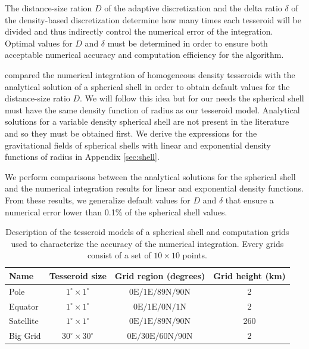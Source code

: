 \documentclass[extra]{gji}
\begin{document}
The distance-size ration $D$ of the adaptive discretization and the delta ratio $\delta$
of the density-based discretization determine how many times each tesseroid will be
divided and thus indirectly control the numerical error of the integration.
Optimal values for $D$ and $\delta$ must be determined in order to ensure both
acceptable numerical accuracy and computation efficiency for the algorithm.

\citet{Uieda2016} compared the numerical integration of homogeneous density tesseroids
with the analytical solution of a spherical shell \citep{Mikuska2006,Grombein2013} in
order to obtain default values for the distance-size ratio $D$.
We will follow this idea but for our needs the spherical shell must
have the same density function of radius as our tesseroid model.
Analytical solutions for a variable density spherical shell are not present in the
literature and so they must be obtained first.
We derive the expressions for the gravitational fields of spherical shells with linear
and exponential density functions of radius in Appendix \ref{sec:shell}.

We perform comparisons between the analytical solutions for the spherical shell and the
numerical integration results for linear and exponential density functions.
From these results, we generalize default values for $D$ and $\delta$ that ensure a
numerical error lower than 0.1\% of the spherical shell values.

\begin{table}
\caption{
    Description of the tesseroid models of a spherical shell and computation grids
    used to characterize the accuracy of the numerical integration.
    Every grids consist of a set of $10 \times 10$ points.
}
\label{tab:grids}
\begin{tabular}{lccc}
    Name & Tesseroid size & Grid region (degrees) & Grid height (km)
    \\ \hline
    Pole & $1^\circ \times 1^\circ$ & $0\text{E}/1\text{E}/89\text{N}/90\text{N}$ & 2 \\
    Equator & $1^\circ \times 1^\circ$ & $0\text{E}/1\text{E}/0\text{N}/1\text{N}$ & 2 \\
    Satellite & $1^\circ \times 1^\circ$ & $0\text{E}/1\text{E}/89\text{N}/90\text{N}$ & 260 \\
    Big Grid & $30^\circ \times 30^\circ$ & $0\text{E}/30\text{E}/60\text{N}/90\text{N}$ & 2 \\
\end{tabular}
\end{table}
\end{document}
